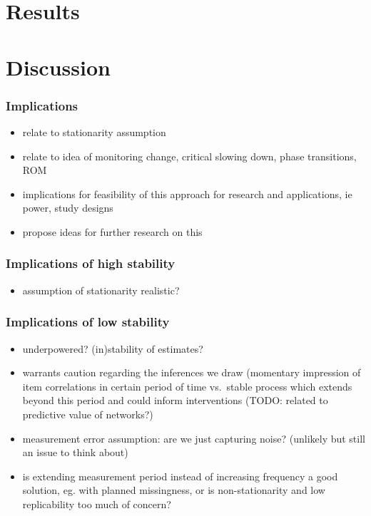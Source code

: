 \documentclass[
  english,
  man]{apa6}
\providecommand{\tightlist}{%
  \setlength{\itemsep}{0pt}\setlength{\parskip}{0pt}}
\begin{document}
\hypertarget{results}{%
\section{Results}\label{results}}

\hypertarget{discussion}{%
\section{Discussion}\label{discussion}}

\hypertarget{implications}{%
\subsubsection{Implications}\label{implications}}

\begin{itemize}
\tightlist
\item
  relate to stationarity assumption
\item
  relate to idea of monitoring change, critical slowing down, phase transitions, ROM
\item
  implications for feasibility of this approach for research and applications, ie power, study designs
\item
  propose ideas for further research on this
\end{itemize}

\hypertarget{implications-of-high-stability}{%
\subsubsection{Implications of high stability}\label{implications-of-high-stability}}

\begin{itemize}
\tightlist
\item
  assumption of stationarity realistic?
\end{itemize}

\hypertarget{implications-of-low-stability}{%
\subsubsection{Implications of low stability}\label{implications-of-low-stability}}

\begin{itemize}
\tightlist
\item
  underpowered? (in)stability of estimates?
\item
  warrants caution regarding the inferences we draw (momentary impression of item correlations in certain period of time vs.~stable process which extends beyond this period and could inform interventions (TODO: related to predictive value of networks?)
\item
  measurement error assumption: are we just capturing noise? (unlikely but still an issue to think about)
\item
  is extending measurement period instead of increasing frequency a good solution, eg. with planned missingness, or is non-stationarity and low replicability too much of concern?
\end{itemize}
\end{document}
